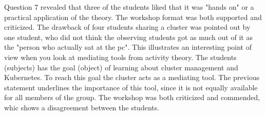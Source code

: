 \noindent
Question 7 revealed that three of the students liked that it was "hands on" or a practical application of the theory. The workshop format was both supported and criticized. The drawback of four students sharing a cluster was pointed out by one student, who did not think the observing students got as much out of it as the "person who actually sat at the pc". This illustrates an interesting point of view when you look at mediating tools from activity theory. The students (subjects) has the goal (object) of learning about cluster management and Kubernetes. To reach this goal the cluster acts as a mediating tool. The previous statement underlines the importance of this tool, since it is not equally available for all members of the group. The workshop was both criticized and commended, whic shows a disagreement between the students.
 
